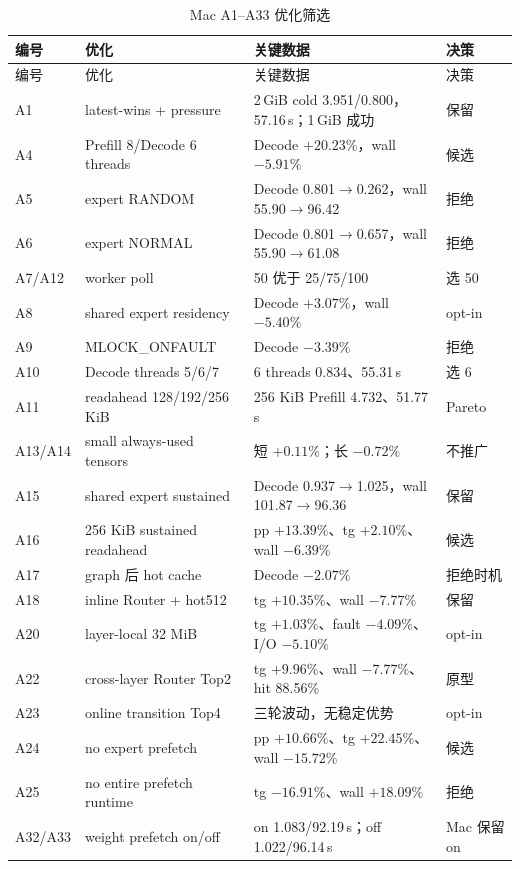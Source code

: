 \begin{longtable}{p{}p{}p{}p{}}
  \caption{Mac A1--A33 优化筛选}\label{tab:appendix-mac-screen}\\
  \toprule 编号 & 优化 & 关键数据 & 决策 \\
  \midrule
  \endfirsthead
  \toprule 编号 & 优化 & 关键数据 & 决策 \\
  \midrule
  \endhead
  A1 & latest-wins + pressure & 2\,GiB cold 3.951/0.800，57.16\,s；1\,GiB 成功 & 保留 \\
  A4 & Prefill 8/Decode 6 threads & Decode $+20.23\%$，wall $-5.91\%$ & 候选 \\
  A5 & expert RANDOM & Decode 0.801$\rightarrow$0.262，wall 55.90$\rightarrow$96.42 & 拒绝 \\
  A6 & expert NORMAL & Decode 0.801$\rightarrow$0.657，wall 55.90$\rightarrow$61.08 & 拒绝 \\
  A7/A12 & worker poll & 50 优于 25/75/100 & 选 50 \\
  A8 & shared expert residency & Decode $+3.07\%$，wall $-5.40\%$ & opt-in \\
  A9 & MLOCK\_ONFAULT & Decode $-3.39\%$ & 拒绝 \\
  A10 & Decode threads 5/6/7 & 6 threads 0.834、55.31\,s & 选 6 \\
  A11 & readahead 128/192/256 KiB & 256 KiB Prefill 4.732、51.77\,s & Pareto \\
  A13/A14 & small always-used tensors & 短 $+0.11\%$；长 $-0.72\%$ & 不推广 \\
  A15 & shared expert sustained & Decode 0.937$\rightarrow$1.025，wall 101.87$\rightarrow$96.36 & 保留 \\
  A16 & 256 KiB sustained readahead & pp $+13.39\%$、tg $+2.10\%$、wall $-6.39\%$ & 候选 \\
  A17 & graph 后 hot cache & Decode $-2.07\%$ & 拒绝时机 \\
  A18 & inline Router + hot512 & tg $+10.35\%$、wall $-7.77\%$ & 保留 \\
  A20 & layer-local 32 MiB & tg $+1.03\%$、fault $-4.09\%$、I/O $-5.10\%$ & opt-in \\
  A22 & cross-layer Router Top2 & tg $+9.96\%$、wall $-7.77\%$、hit 88.56\% & 原型 \\
  A23 & online transition Top4 & 三轮波动，无稳定优势 & opt-in \\
  A24 & no expert prefetch & pp $+10.66\%$、tg $+22.45\%$、wall $-15.72\%$ & 候选 \\
  A25 & no entire prefetch runtime & tg $-16.91\%$、wall $+18.09\%$ & 拒绝 \\
  A32/A33 & weight prefetch on/off & on 1.083/92.19\,s；off 1.022/96.14\,s & Mac 保留 on \\
  \bottomrule
\end{longtable}

